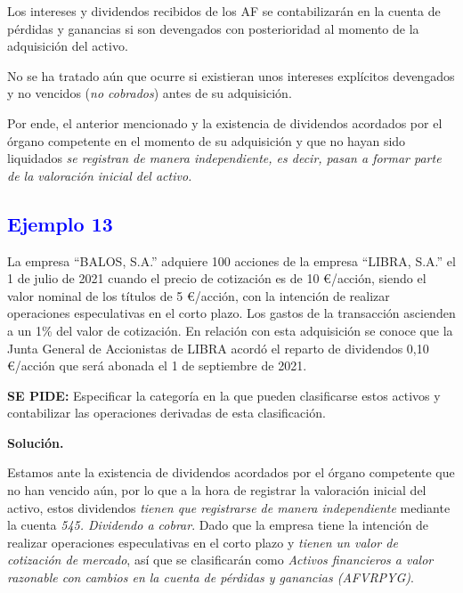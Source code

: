 Los intereses y dividendos recibidos de los AF se contabilizarán en la cuenta de pérdidas y ganancias si son devengados con posterioridad al momento de la adquisición del activo.

No se ha tratado aún que ocurre si existieran unos intereses explícitos devengados y no vencidos (\textit{no cobrados}) antes de su adquisición.

Por ende, el anterior mencionado y la existencia de dividendos acordados  por el órgano competente en el momento de su adquisición y que no hayan sido liquidados \textit{se registran de manera independiente, es decir, pasan a formar parte de la valoración inicial del activo.}


\subsection*{\textcolor{blue}{Ejemplo 13}}

La empresa ``BALOS, S.A.'' adquiere 100 acciones de la empresa ``LIBRA, S.A.'' el 1 de julio de 2021 cuando el precio de cotización es de 10 €/acción, siendo el valor nominal de los títulos de 5 €/acción, con la intención de realizar operaciones especulativas en el corto plazo. Los gastos de la transacción ascienden a un 1\% del valor de cotización. En relación con esta adquisición se conoce que la Junta General de Accionistas de LIBRA acordó el reparto de dividendos 0,10 €/acción que será abonada el 1 de septiembre de 2021.

\textbf{SE PIDE:} Especificar la categoría en la que pueden clasificarse estos activos y contabilizar las operaciones derivadas de esta clasificación.

\textbf{Solución.}

Estamos ante la existencia de dividendos acordados por el órgano competente que no han vencido aún, por lo que a la hora de registrar la valoración inicial del activo, estos dividendos \textit{tienen que registrarse de manera independiente} mediante la cuenta \textit{545. Dividendo a cobrar}.
Dado que la empresa tiene la intención de realizar operaciones especulativas en el corto plazo y \textit{tienen un valor de cotización de mercado}, así que se clasificarán como \textit{Activos financieros a valor razonable con cambios en la cuenta de pérdidas y ganancias (AFVRPYG)}.

